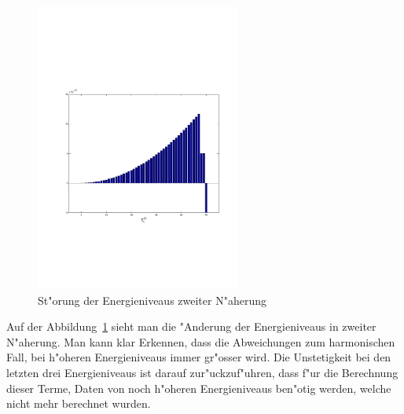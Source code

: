 \begin{refsection}
\begin{figure}[h]	%
\centering
\includegraphics[width=0.6\textwidth]{anharmonisch/images/x3/EK2.pdf}
\caption{St"orung der Energieniveaus zweiter N"aherung
\label{skript:x3_EK2}}
\end{figure}

Auf der Abbildung~\ref{skript:x3_EK2} sieht man die "Anderung der Energieniveaus in zweiter N"aherung. Man kann klar Erkennen, dass die Abweichungen zum harmonischen Fall, bei h"oheren Energieniveaus immer gr"osser wird. Die Unstetigkeit bei den letzten drei Energieniveaus ist darauf zur"uckzuf"uhren, dass f"ur die Berechnung dieser Terme, Daten von noch h"oheren Energieniveaus ben"otig werden, welche nicht mehr berechnet wurden.


\end{refsection}

